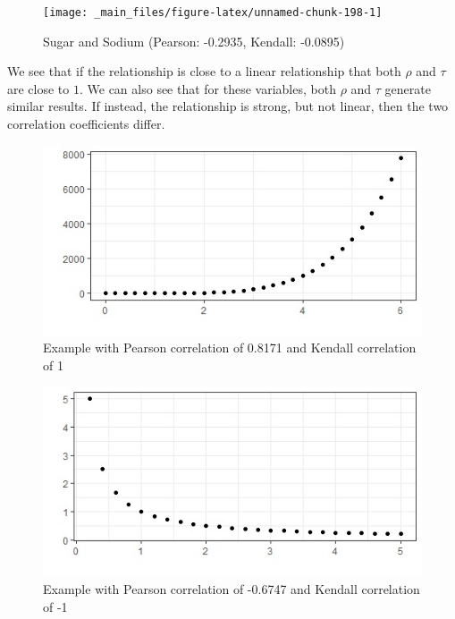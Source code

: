 \documentclass[
]{book}
\theoremstyle{definition}
\theoremstyle{definition}
\theoremstyle{definition}
\theoremstyle{definition}
\theoremstyle{remark}
\begin{document}
\begin{figure}

{\centering \texttt{[image: \_main\_files/figure-latex/unnamed-chunk-198-1]} 

}

\caption{Sugar and Sodium (Pearson: -0.2935, Kendall: -0.0895)}\label{fig:unnamed-chunk-198}
\end{figure}

We see that if the relationship is close to a linear relationship that both \(\rho\) and \(\tau\) are close to \(1\). We can also see that for these variables, both \(\rho\) and \(\tau\) generate similar results. If instead, the relationship is strong, but not linear, then the two correlation coefficients differ.

\begin{figure}

{\centering \includegraphics[width=0.8\linewidth]{images/correl_example1} 

}

\caption{Example with Pearson correlation of 0.8171 and Kendall correlation of 1}\label{fig:unnamed-chunk-199}
\end{figure}

\begin{figure}

{\centering \includegraphics[width=0.8\linewidth]{images/correl_example2} 

}

\caption{Example with Pearson correlation of -0.6747 and Kendall correlation of -1}\label{fig:unnamed-chunk-200}
\end{figure}
\end{document}
